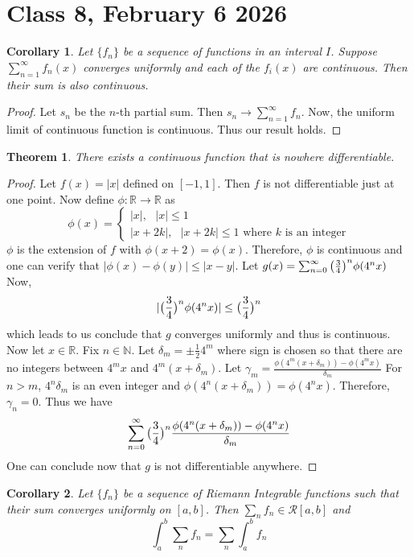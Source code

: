 \documentclass{article}
\newtheorem{theorem}{Theorem}
\newtheorem{corollary}{Corollary}
\begin{document}
\section*{Class 8, February 6 2026}
\begin{corollary}
    Let $\{f_n\}$ be a sequence of functions in an interval $I$. Suppose $\sum_{n=1}^{\infty}f_n(x)$ converges uniformly and each of the $f_i(x)$ are continuous. Then their sum is also continuous.
\end{corollary}
\begin{proof}
    Let $s_n$ be the $n$-th partial sum. Then $s_n\to \sum_{n=1}^{\infty}f_n$. Now, the uniform limit of continuous function is continuous. Thus our result holds.
\end{proof}
\begin{theorem}
    There exists a continuous function that is nowhere differentiable.
\end{theorem}
\begin{proof}
    Let $f(x)=|x|$ defined on $[-1,1]$. Then $f$ is not differentiable just at one point. Now define $\phi:\mathbb{R}\to\mathbb{R}$ as 
    $$
    \phi(x)=
    \begin{cases}
    |x|, \text{ } |x|\leq 1\\
    |x+2k| ,\text{ }|x+2k|\leq 1\text{ where }k \text{ is an integer}
    \end{cases}
    $$
$\phi$ is the extension of $f$ with $\phi(x+2)=\phi(x)$. Therefore, $\phi$ is continuous and one can verify that $|\phi(x)-\phi(y)|\leq |x-y|$. Let $g(x)=\sum_{n=0}^{\infty}\big{(}\frac{3}{4}\big{)}^n \phi(4^n x)$
Now, 
$$|\big{(}\frac{3}{4}\big{)}^n \phi(4^n x)|\leq \big{(}\frac{3}{4}\big{)}^n$$
which leads to us conclude that $g$ converges uniformly and thus is continuous.
\\ Now let $x\in\mathbb{R}$. Fix $n\in\mathbb{N}$. Let $\delta_m =\pm \frac{1}{2}4^{m}$ where sign is chosen so that there are no integers between $4^m x$ and $4^m (x+\delta_m)$.
Let $\gamma_m=\frac{\phi(4^m (x+\delta_m))-\phi(4^m x)}{\delta_m}$
For $n>m$, $4^n \delta_m$ is an even integer and $\phi(4^n (x+\delta_m))=\phi(4^n x)$. Therefore, $\gamma_n=0$. 
Thus we have $$\sum_{n=0}^{\infty}\big{(}\frac{3}{4}\big{)}^n \frac{\phi(4^n (x+\delta_m))-\phi(4^n x)}{\delta_m}$$ 
One can conclude now that $g$ is not differentiable anywhere.     
\end{proof}
\begin{corollary}
    Let $\{f_n\}$ be a sequence of Riemann Integrable functions such that their sum converges uniformly on $[a,b]$. Then $\sum_{n}f_n \in \mathcal{R}[a,b]$ and $$\int_a^b \sum_{n}f_n=\sum_{n}\int_a^b f_n$$
\end{corollary}
\end{document}

